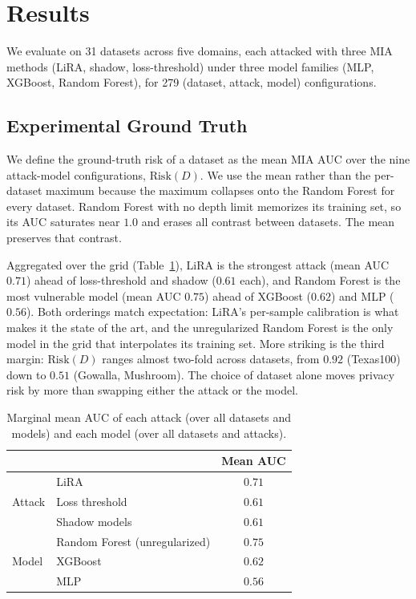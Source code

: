 \section{Results}
\label{sec:results}

We evaluate on 31 datasets across five domains, each attacked with three MIA
methods (LiRA, shadow, loss-threshold) under three model families (MLP,
XGBoost, Random Forest), for 279 (dataset, attack, model) configurations.

\subsection{Experimental Ground Truth}

We define the ground-truth risk of a dataset as the mean MIA AUC over the
nine attack-model configurations, $\mathrm{Risk}(D)$.
We use the mean rather than the per-dataset maximum because the maximum
collapses onto the Random Forest for every dataset. Random Forest with no
depth limit memorizes its training set, so its AUC saturates near $1.0$ and
erases all contrast between datasets. The mean preserves that contrast.

Aggregated over the grid (Table~\ref{tab:marginals}), LiRA is the
strongest attack (mean AUC $0.71$) ahead of loss-threshold and shadow
($0.61$ each), and Random Forest is the most vulnerable model (mean AUC
$0.75$) ahead of XGBoost ($0.62$) and MLP ($0.56$). Both orderings match
expectation: LiRA's per-sample calibration is what makes it the
state of the art, and the unregularized Random Forest is the only model
in the grid that interpolates its training set. More striking is the
third margin: $\mathrm{Risk}(D)$ ranges almost two-fold across datasets,
from $0.92$ (Texas100) down to $0.51$ (Gowalla, Mushroom). The choice of
dataset alone moves privacy risk by more than swapping either the attack
or the model.

\begin{table}[t]
\centering
\caption{Marginal mean AUC of each attack (over all datasets and models)
         and each model (over all datasets and attacks).}
\label{tab:marginals}
\small
\begin{tabular}{llc}
\toprule
 & & \textbf{Mean AUC} \\
\midrule
\multirow{3}{*}{Attack}
 & LiRA~\cite{carlini2022lira}            & $0.71$ \\
 & Loss threshold~\cite{yeom2018privacy}  & $0.61$ \\
 & Shadow models~\cite{shokri2017membership} & $0.61$ \\
\midrule
\multirow{3}{*}{Model}
 & Random Forest (unregularized)          & $0.75$ \\
 & XGBoost                                & $0.62$ \\
 & MLP                                    & $0.56$ \\
\bottomrule
\end{tabular}
\end{table}

